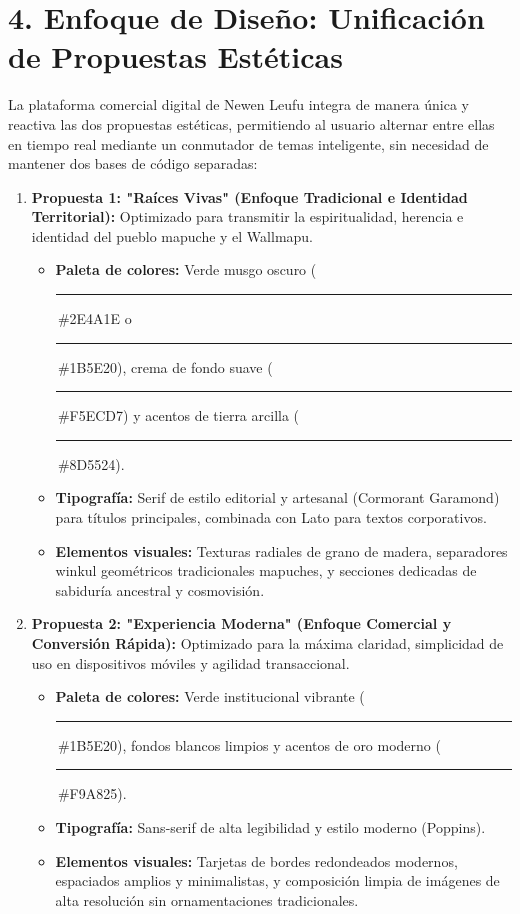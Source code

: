 \documentclass[11pt,a4paper]{article}
\begin{document}
\section{4. Enfoque de Diseño: Unificación de Propuestas Estéticas}
La plataforma comercial digital de Newen Leufu integra de manera única y reactiva las dos propuestas estéticas, permitiendo al usuario alternar entre ellas en tiempo real mediante un conmutador de temas inteligente, sin necesidad de mantener dos bases de código separadas:

\begin{enumerate}
    \item \textbf{Propuesta 1: "Raíces Vivas" (Enfoque Tradicional e Identidad Territorial):}
    Optimizado para transmitir la espiritualidad, herencia e identidad del pueblo mapuche y el Wallmapu.
    \begin{itemize}[itemsep=2pt]
        \item \textbf{Paleta de colores:} Verde musgo oscuro (\textcolor{tradgreen}{\rule{1.3ex}{1.3ex}}\,\#2E4A1E o \textcolor{greennewen}{\rule{1.3ex}{1.3ex}}\,\#1B5E20), crema de fondo suave (\textcolor{cremabg}{\rule{1.3ex}{1.3ex}}\,\#F5ECD7) y acentos de tierra arcilla (\textcolor{claybrown}{\rule{1.3ex}{1.3ex}}\,\#8D5524).
        \item \textbf{Tipografía:} Serif de estilo editorial y artesanal (Cormorant Garamond) para títulos principales, combinada con Lato para textos corporativos.
        \item \textbf{Elementos visuales:} Texturas radiales de grano de madera, separadores winkul geométricos tradicionales mapuches, y secciones dedicadas de sabiduría ancestral y cosmovisión.
    \end{itemize}
    
    \item \textbf{Propuesta 2: "Experiencia Moderna" (Enfoque Comercial y Conversión Rápida):}
    Optimizado para la máxima claridad, simplicidad de uso en dispositivos móviles y agilidad transaccional.
    \begin{itemize}[itemsep=2pt]
        \item \textbf{Paleta de colores:} Verde institucional vibrante (\textcolor{greennewen}{\rule{1.3ex}{1.3ex}}\,\#1B5E20), fondos blancos limpios y acentos de oro moderno (\textcolor{goldnewen}{\rule{1.3ex}{1.3ex}}\,\#F9A825).
        \item \textbf{Tipografía:} Sans-serif de alta legibilidad y estilo moderno (Poppins).
        \item \textbf{Elementos visuales:} Tarjetas de bordes redondeados modernos, espaciados amplios y minimalistas, y composición limpia de imágenes de alta resolución sin ornamentaciones tradicionales.
    \end{itemize}
\end{enumerate}
\end{document}
